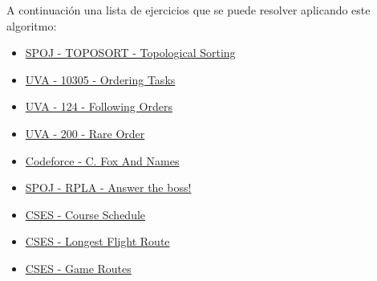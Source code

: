 A continuación una lista de ejercicios que se puede resolver aplicando este algoritmo:

\begin{itemize}
	\item \href{https://www.spoj.com/problems/TOPOSORT/}{SPOJ - TOPOSORT - Topological Sorting}
	\item \href{https://onlinejudge.org/index.php?option=com_onlinejudge&Itemid=8&page=show_problem&problem=1246}{UVA - 10305 - Ordering Tasks}
	\item \href{https://onlinejudge.org/index.php?option=onlinejudge&page=show_problem&problem=60}{UVA - 124 - Following Orders}
	\item \href{https://onlinejudge.org/index.php?option=onlinejudge&page=show_problem&problem=136}{UVA - 200 - Rare Order}
	\item \href{https://codeforces.com/problemset/problem/510/C}{Codeforce - C. Fox And Names}
	\item \href{https://www.spoj.com/problems/RPLA/}{SPOJ - RPLA - Answer the boss!}
	\item \href{https://cses.fi/problemset/task/1679}{CSES - Course Schedule}
	\item \href{https://cses.fi/problemset/task/1680}{CSES - Longest Flight Route}
	\item \href{https://cses.fi/problemset/task/1681}{CSES - Game Routes}
\end{itemize}